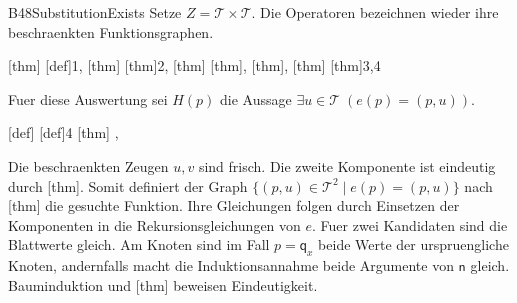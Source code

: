 {B48SubstitutionExists}{
}
Setze \(Z=\mathcal T\times\mathcal T\).
Die Operatoren bezeichnen wieder ihre beschraenkten Funktionsgraphen.
\begin{tabproof}
  {[thm]}
  {[def]{1},
   [thm]}
  {[thm]{2},
   [thm]}
  {[thm],
   [thm],
   [thm]}
  {[thm]{3,4}}
\end{tabproof}
Fuer diese Auswertung sei \(H(p)\) die Aussage
\(\exists u\in\mathcal T\;(e(p)=(p,u))\).
\begin{tabproof}
  {[def]}
  {[def]{4}}
  {[thm]
   {,}}
\end{tabproof}
Die beschraenkten Zeugen \(u,v\) sind frisch.
Die zweite Komponente ist eindeutig durch
[thm].
Somit definiert der Graph
\(\{(p,u)\in\mathcal T^2\mid e(p)=(p,u)\}\) nach
[thm] die gesuchte Funktion.
Ihre Gleichungen folgen durch Einsetzen der Komponenten in die
Rekursionsgleichungen von \(e\).
Fuer zwei Kandidaten sind die Blattwerte gleich. Am Knoten sind im
Fall \(p=\mathsf q_x\) beide Werte der urspruengliche Knoten,
andernfalls macht die Induktionsannahme beide Argumente von
\(\mathsf n\) gleich. Bauminduktion und
[thm] beweisen Eindeutigkeit.

